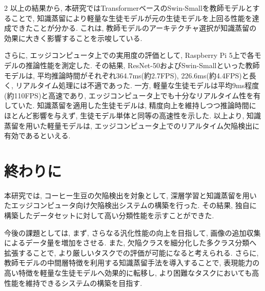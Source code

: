 \documentclass{jpreprint}
\begin{document}
\begin{multicols}{2}
以上の結果から, 本研究ではTransformerベースのSwin-Smallを教師モデルとすることで, 知識蒸留により軽量な生徒モデルが元の生徒モデルを上回る性能を達成できたことが分かる.  
これは, 教師モデルのアーキテクチャ選択が知識蒸留の効果に大きく影響することを示唆している.  

さらに, エッジコンピュータ上での実用度の評価として, Raspberry Pi 5上で各モデルの推論性能を測定した.  
その結果, ResNet-50およびSwin-Smallといった教師モデルは, 平均推論時間がそれぞれ364.7ms(約2.7FPS), 226.6ms(約4.4FPS)と長く, リアルタイム処理には不適であった.  
一方, 軽量な生徒モデルは平均9ms程度(約110FPS)と高速であり, エッジコンピュータ上でも十分なリアルタイム性を有していた.  
知識蒸留を適用した生徒モデルは, 精度向上を維持しつつ推論時間にほとんど影響を与えず, 生徒モデル単体と同等の高速性を示した.  
以上より, 知識蒸留を用いた軽量モデルは, エッジコンピュータ上でのリアルタイム欠陥検出に有効であるといえる.  

\section{終わりに}
本研究では, コーヒー生豆の欠陥検出を対象として, 深層学習と知識蒸留を用いたエッジコンピュータ向け欠陥検出システムの構築を行った. 
その結果, 独自に構築したデータセットに対して高い分類性能を示すことができた.

今後の課題としては, まず, さらなる汎化性能の向上を目指して, 画像の追加収集によるデータ量を増加をさせる. 
また, 欠陥クラスを細分化した多クラス分類へ拡張することで, より厳しいタスクでの評価が可能になると考えられる. 
さらに, 教師モデルの中間層特徴を利用する知識蒸留手法を導入することで, 表現能力の高い特徴を軽量な生徒モデルへ効果的に転移し, より困難なタスクにおいても高性能を維持できるシステムの構築を目指す.

{\small

}

\end{multicols}
\end{document}
